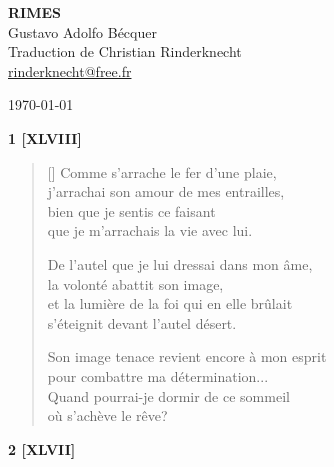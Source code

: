 \documentclass[a4paper,12pt]{book}
\begin{document}
\thispagestyle{empty}
\vspace*{70mm}
\begin{center}
{\Huge\textbf{RIMES}} \\
\vspace*{10mm}
{\Large Gustavo Adolfo Bécquer} \\
\vspace*{10mm}
Traduction de Christian Rinderknecht\\
\url{rinderknecht@free.fr}
\end{center}

\centerline\today

\cleardoublepage

\frenchspacing  %

\newpage


\begin{center}
  \textbf{1 [XLVIII]}
\end{center}

\settowidth{\versewidth}{et la lumière de la foi qui en elle brûlait}

\begin{verse}[\versewidth]
  Comme s'arrache le fer d'une plaie, \\
  j'arrachai son amour de mes entrailles, \\
  bien que je sentis ce faisant \\
  que je m'arrachais la vie avec lui.

  De l'autel que je lui dressai dans mon âme, \\
  la volonté abattit son image, \\
  et la lumière de la foi qui en elle brûlait \\
  s'éteignit devant l'autel désert.

  Son image tenace revient encore à mon esprit \\
  pour combattre ma détermination... \\
  Quand pourrai-je dormir de ce sommeil \\
  où s'achève le rêve?
\end{verse}

\bigskip

\begin{center}
  \textbf{2 [XLVII]}
\end{center}
\end{document}
